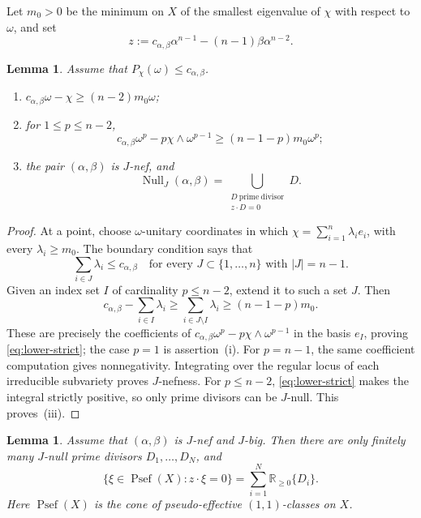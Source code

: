 \documentclass[reqno]{amsart}
\newcommand{\R}{\mathbb{R}}
\newcommand{\Psef}{\operatorname{Psef}}
\newcommand{\JNull}{\operatorname{Null}_{J}}
\newcommand{\cab}{c_{\alpha,\beta}}
\theoremstyle{plain}
\newtheorem{lemma}[thm]{Lemma}
\theoremstyle{remark}
\begin{document}
Let $m_0>0$ be the minimum on $X$ of the smallest eigenvalue of
$\chi$ with respect to $\omega$, and set
\[
 z:=\cab\alpha^{n-1}-(n-1)\beta\alpha^{n-2}.
\]
\begin{lemma}\label{lem:only-divisors}
Assume that $P_\chi(\omega)\leq\cab$.
\begin{enumerate}[label=\textup{(\roman*)}]
\item $\cab\omega-\chi\geq(n-2)m_0\omega$;
\item for $1\leq p\leq n-2$,
  \begin{equation}\label{eq:lower-strict}
   \cab\omega^p-p\chi\wedge\omega^{p-1}
   \geq(n-1-p)m_0\omega^p;
  \end{equation}
\item the pair $(\alpha,\beta)$ is $J$-nef, and
\[
 \JNull(\alpha,\beta)
 =\bigcup_{\substack{D\ \mathrm{prime\ divisor}\\z\cdot D=0}}D.
\]
\end{enumerate}
\end{lemma}
\begin{proof}
At a point, choose $\omega$-unitary coordinates in which
$\chi=\sum_{i=1}^n\lambda_i e_i$, with every $\lambda_i\geq m_0$.
The boundary condition says that
\[
 \sum_{i\in J}\lambda_i\leq\cab
 \quad\text{for every }J\subset\{1,\ldots,n\}
 \text{ with }|J|=n-1.
\]
Given an index set $I$ of cardinality $p\leq n-2$, extend it to such
a set $J$. Then
\[
 \cab-\sum_{i\in I}\lambda_i
 \geq\sum_{i\in J\setminus I}\lambda_i
 \geq(n-1-p)m_0.
\]
These are precisely the coefficients of
$\cab\omega^p-p\chi\wedge\omega^{p-1}$ in the basis $e_I$, proving
\eqref{eq:lower-strict}; the case $p=1$ is assertion~\textup{(i)}.
For $p=n-1$, the same coefficient computation gives nonnegativity.
Integrating over the regular locus of each irreducible subvariety
proves $J$-nefness. For $p\leq n-2$, \eqref{eq:lower-strict} makes
the integral strictly positive, so only prime divisors can be
$J$-null. This proves~\textup{(iii)}.
\end{proof}
\begin{lemma}\label{lem:finite-face}
Assume that $(\alpha,\beta)$ is $J$-nef and $J$-big. Then there are
only finitely many $J$-null prime divisors $D_1,\ldots,D_N$, and
\begin{equation}\label{eq:zero-face}
 \{\xi\in\Psef(X):z\cdot\xi=0\}
 =
 \sum_{i=1}^N\R_{\geq0}\{D_i\}.
\end{equation}
Here $\Psef(X)$ is the cone of pseudo-effective $(1,1)$-classes on $X$.
\end{lemma}
\end{document}
